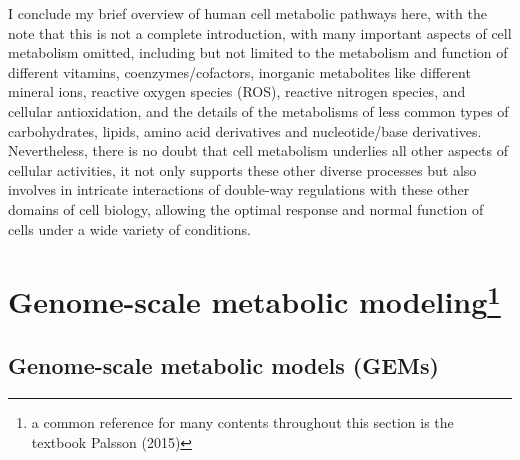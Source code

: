 \documentclass[12pt,twoside,openany,\mydriver]{thesis}  %
\begin{document}
I conclude my brief overview of human cell metabolic pathways here, with the note that this is not a complete introduction, with many important aspects of cell metabolism omitted, including but not limited to the metabolism and function of different vitamins, coenzymes/cofactors, inorganic metabolites like different mineral ions, reactive oxygen species (ROS), reactive nitrogen species, and cellular antioxidation, and the details of the metabolisms of less common types of carbohydrates, lipids, amino acid derivatives and nucleotide/base derivatives. Nevertheless, there is no doubt that cell metabolism underlies all other aspects of cellular activities, it not only supports these other diverse processes but also involves in intricate interactions of double-way regulations with these other domains of cell biology, allowing the optimal response and normal function of cells under a wide variety of conditions.

\hypertarget{intro-gem}{%
\section[Genome-scale metabolic modeling]{\texorpdfstring{Genome-scale metabolic modeling\footnote{a common reference for many contents throughout this section is the textbook Palsson (2015)}}{Genome-scale metabolic modeling}}\label{intro-gem}}

\hypertarget{genome-scale-metabolic-models-gems}{%
\subsection{Genome-scale metabolic models (GEMs)}\label{genome-scale-metabolic-models-gems}}
\end{document}
